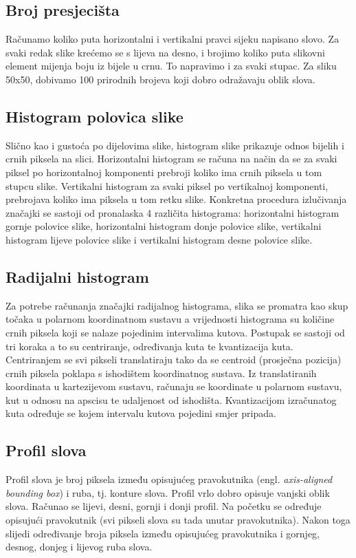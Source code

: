 \documentclass[a4paper,twocolumn,dvipdfm]{article}
\begin{document}
\subsection{Broj presjecišta}
Računamo koliko puta horizontalni i vertikalni pravci sijeku napisano slovo.
Za svaki redak slike krećemo se s lijeva na desno, i brojimo koliko puta
slikovni element mijenja boju iz bijele u crnu. To napravimo i za svaki stupac.
Za sliku 50x50, dobivamo 100 prirodnih brojeva koji dobro odražavaju oblik slova.

\subsection{Histogram polovica slike}
Slično kao i gustoća po dijelovima slike, histogram slike prikazuje odnos 
bijelih i crnih piksela na slici. Horizontalni histogram se računa na način 
da se za svaki piksel po horizontalnoj komponenti prebroji koliko ima crnih 
piksela u tom stupcu slike. Vertikalni histogram za svaki piksel po vertikalnoj 
komponenti, prebrojava koliko ima piksela u tom retku slike. Konkretna 
procedura izlučivanja značajki se sastoji od pronalaska 4 različita histograma: 
horizontalni histogram gornje polovice slike, horizontalni histogram donje 
polovice slike, vertikalni histogram lijeve polovice slike i vertikalni 
histogram desne polovice slike.

\subsection{Radijalni histogram}
Za potrebe računanja značajki radijalnog histograma, slika se promatra kao skup
točaka u polarnom koordinatnom sustavu a vrijednosti histograma su količine
crnih piksela koji se nalaze pojedinim intervalima kutova. Postupak se sastoji
od tri koraka a to su centriranje, određivanja kuta te kvantizacija kuta.
Centriranjem se svi pikseli translatiraju tako da se centroid (prosječna
pozicija) crnih piksela poklapa s ishodištem koordinatnog sustava. Iz
translatiranih koordinata u kartezijevom sustavu, računaju se koordinate u
polarnom sustavu, kut u odnosu na apscisu te udaljenost od ishodišta.
Kvantizacijom izračunatog kuta određuje se kojem intervalu kutova pojedini smjer
pripada.

\subsection{Profil slova}
Profil slova je broj piksela između opisujućeg pravokutnika (engl.
\emph{axis-aligned bounding box}) i ruba, tj. konture slova. Profil vrlo dobro
opisuje vanjski oblik slova. Računao se lijevi, desni, gornji i donji profil. Na
početku se određuje opisujući pravokutnik (svi pikseli slova su tada unutar
pravokutnika). Nakon toga slijedi određivanje broja piksela između opisujućeg
pravokutnika i gornjeg, desnog, donjeg i lijevog ruba slova.
\end{document}
